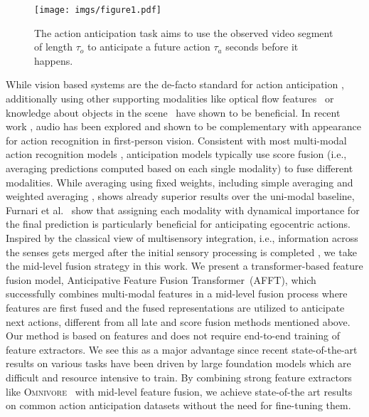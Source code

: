 \documentclass[10pt,twocolumn,letterpaper,dvipsnames]{article}
\newcommand{\sname}{AFFT}
\newcommand{\lname}{Anticipative Feature Fusion Transformer}
\newcommand{\lsname}{\lname\ (\sname)}
\begin{document}
\begin{figure}[t]
  \hspace*{-0.2cm}\texttt{[image: imgs/figure1.pdf]}
  \caption{The action anticipation task aims to use the observed video segment of length $\tau_o$ to anticipate a future action $\tau_a$ seconds before it happens.}
  \label{fig:intro}
\end{figure}
While vision based systems are the de-facto standard for action anticipation \cite{furnariWhatWouldYou2019, girdharAnticipativeVideoTransformer2021, wuMeMViTMemoryAugmentedMultiscale2022}, additionally using other supporting modalities like optical flow features~\cite{wangTemporalSegmentNetworks2016,carreiraQuoVadisAction2017,kazakosEPICFusionAudioVisualTemporal2019} or knowledge about objects in the scene~\cite{furnari2017next} have shown to be beneficial.
In recent work \cite{kazakosEPICFusionAudioVisualTemporal2019,kazakosLittleHelpMy2021,nagraniAttentionBottlenecksMultimodal2021}, audio has been explored and shown to be complementary with appearance for action recognition in first-person vision. 
Consistent with most multi-modal action recognition models \cite{wangTemporalSegmentNetworks2016,carreiraQuoVadisAction2017}, anticipation models typically use score fusion (i.e., averaging predictions computed based on each single modality) to fuse different modalities. While averaging using fixed weights, including simple averaging \cite{senerTemporalAggregateRepresentations2020} and weighted averaging \cite{girdharAnticipativeVideoTransformer2021}, shows already superior results over the uni-modal baseline, Furnari et al.~\cite{furnariWhatWouldYou2019} show that assigning each modality with dynamical importance for the final prediction is particularly beneficial for anticipating egocentric actions. 
Inspired by the classical view of multisensory integration, i.e., information across the senses gets merged after the initial sensory processing is completed \cite{bloom1988brain,talsma2015predictive}, we take the mid-level fusion strategy in this work.
We present a transformer-based feature fusion model, \lsname, which successfully combines multi-modal features in a mid-level fusion process where features are first fused and the fused representations are utilized to anticipate next actions, different from all late and score fusion methods mentioned above. 
Our method is based on features and does not require end-to-end training of feature extractors. We see this as a major advantage since recent state-of-the-art results on various tasks have been driven by large foundation models which are difficult and resource intensive to train.
By combining strong feature extractors like \textsc{Omnivore}~\cite{girdharOmnivoreSingleModel2022} with mid-level feature fusion, we achieve state-of-the art results on common action anticipation datasets without the need for fine-tuning them.
\end{document}

